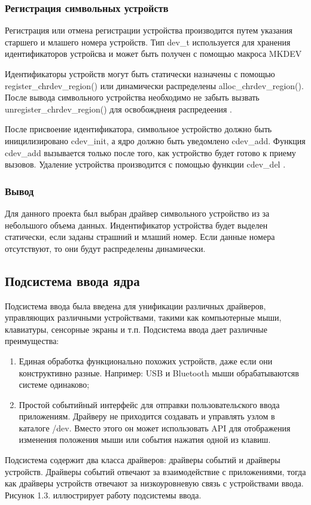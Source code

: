 \subsubsection{Регистрация символьных устройств}
Регистрация или отмена регистрации устройства производится путем указания старшего и млашего номера устройств.
Тип dev\_t используется для хранения идентификаторов устройсва и может быть получен с помощью макроса MKDEV

Идентификаторы устройств могут быть статически назначены с помощью register\_chrdev\_region() или динамически распределены alloc\_chrdev\_region().
После вывода символьного устройства необходимо не забыть вызвать unregister\_chrdev\_region() для освобожднеия распредеения \cite{7}.

После присвоение идентификатора, символьное устройство должно быть иницилизировано cdev\_init, а ядро должно быть уведомлено cdev\_add.
Функция cdev\_add вызывается только после того, как устройство будет готово к приему вызовов.
Удаление устройства производится с помощью функции cdev\_del \cite{7}.

\subsubsection{Вывод}
Для данного проекта был выбран драйвер символьного устройство из за небольшого объема данных.
Индентификатор устройства будет выделен статически, если заданы страшний и млаший номер.
Если данные номера отсутствуют, то они будут распределены динамически.

\subsection{Подсистема ввода ядра}
Подсистема ввода была введена для унификации различных драйверов, управляющих различными устройствами, такими как компьютерные мыши, клавиатуры, сенсорные экраны и т.п. Подсистема ввода дает различные преимущества:
\begin{enumerate}
	\item Единая обработка функционально похожих устройств, даже если они конструктивно разные. 
	Например: USB и Bluetooth мыши обрабатываютсяв системе одинаково;
	\item Простой событийный интерфейс для отправки пользовательского ввода приложениям. 
	Драйверу не приходится создавать и управлять узлом в каталоге /dev. 
	Вместо этого он может использовать API для отображения изменения положения мыши или события нажатия одной из клавиш. 
\end{enumerate}

Подсистема содержит два класса драйверов: драйверы событий и драйверы устройств. 
Драйверы событий отвечают за взаимодействие с приложениями, тогда как драйверы устройств отвечают за низкоуровневую связь с устройствами ввода. 
Рисунок 1.3. иллюстрирует работу подсистемы ввода.




